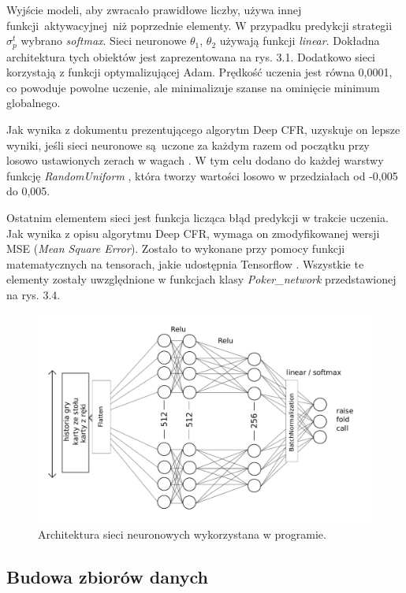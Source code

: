 \documentclass[12pt,oneside,a4paper]{report}
\begin{document}
Wyjście modeli, aby zwracało prawidłowe liczby, używa innej funkcji aktywacyjnej niż poprzednie
elementy. W przypadku predykcji
strategii $\sigma_{p}^{t}$ wybrano \emph{softmax}. 
Sieci neuronowe $\theta_{1}$, $\theta_{2}$ używają funkcji \emph{linear}.
Dokładna architektura tych obiektów jest zaprezentowana na rys. 3.1.
Dodatkowo sieci korzystają z funkcji optymalizującej Adam.
Prędkość uczenia jest równa 0,0001, co powoduje powolne uczenie, ale minimalizuje szanse na
ominięcie minimum globalnego. 

Jak wynika z dokumentu prezentującego algorytm Deep CFR, uzyskuje on lepsze wyniki, jeśli sieci
neuronowe są uczone za każdym razem od początku przy losowo ustawionych zerach w wagach \cite{DCFR}. 
W tym celu dodano do każdej warstwy funkcję \emph{RandomUniform} \cite{tensorflow}, 
która tworzy wartości losowo w przedziałach od
-0,005 do 0,005.

Ostatnim elementem sieci jest funkcja licząca błąd predykcji w trakcie uczenia. Jak wynika z 
opisu algorytmu Deep CFR, wymaga on zmodyfikowanej wersji MSE (\emph{Mean Square Error}).
Zostało to wykonane przy pomocy 
funkcji matematycznych na tensorach, jakie udostępnia Tensorflow \cite{tensorflow}.
Wszystkie te elementy zostały uwzględnione w funkcjach klasy \emph{Poker\_network} przedstawionej na
rys. 3.4.


\begin{figure}[!ht]
  \centering
  \includegraphics[width=1\textwidth]{./img/nn.pdf}
  \caption{Architektura sieci neuronowych wykorzystana w programie.}
\end{figure}

\subsection{Budowa zbiorów danych}
\end{document}
